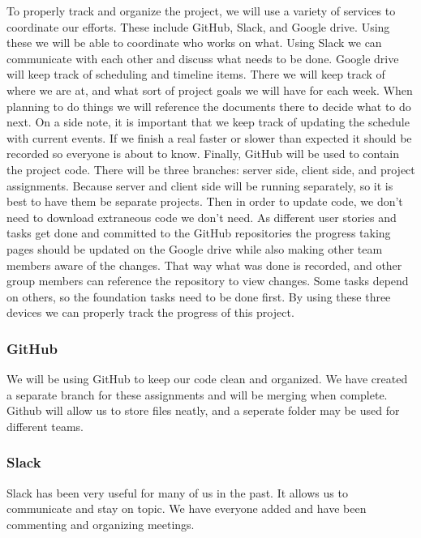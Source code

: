 \documentclass[12pt]{article}
\begin{document}
To properly track and organize the project, we will use a variety of services to
coordinate our efforts. These include GitHub, Slack, and Google drive. Using
these we will be able to coordinate who works on what.\newline\newline
Using Slack we can
communicate with each other and discuss what needs to be done.\newline\newline
Google drive
will keep track of scheduling and timeline items. There we will keep track of
where we are at, and what sort of project goals we will have for each week. When
planning to do things we will reference the documents there to decide what to do
next. On a side note, it is important that we keep track of updating the
schedule with current events. If we finish a real faster or slower than expected
it should be recorded so everyone is about to know.\newline\newline
Finally, GitHub will be used
to contain the project code. There will be three branches: server side, client
side, and project assignments. Because server and client side will be running
separately, so it is best to have them be separate projects. Then in order to
update code, we don't need to download extraneous code we don't need.\newline\newline
As
different user stories and tasks get done and committed to the GitHub
repositories the progress taking pages should be updated on the Google drive
while also making other team members aware of the changes. That way what was
done is recorded, and other group members can reference the repository to view
changes. Some tasks depend on others, so the foundation tasks need to be done
first. By using these three devices we can properly track the progress of this
project.\newline

\subsubsection{GitHub}
	We will be using GitHub to keep our code clean and organized. We have created a separate branch for these assignments and will be merging when complete. Github will allow us to store files neatly, and a seperate folder may be used for different teams.
\subsubsection{Slack}
	Slack has been very useful for many of us in the past. It allows us to communicate and stay on topic. We have everyone added and have been commenting and organizing meetings.
\end{document}
